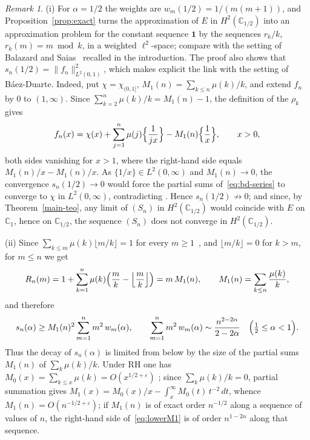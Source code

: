 \documentclass[11pt]{extarticle}
\numberwithin{equation}{section}
\theoremstyle{plain}
\theoremstyle{remark}
\newtheorem{remark}[theorem]{Remark}
\begin{document}
\begin{remark}\label{rem:exact}
(i) For $\alpha = 1/2$ the weights are $w_m(1/2) = 1/(m(m+1))$, and
Proposition~\ref{prop:exact} turns the approximation of $E$ in
$H^2(\mathbb{C}_{1/2})$ into an approximation problem for the constant sequence
$\mathbf{1}$ by the sequences $r_k/k$, $r_k(m) = m \bmod k$, in a weighted
$\ell^2$-space; compare with the setting of Balazard and Saias~\cite{Balazard}
recalled in the introduction. The proof also shows that
$s_n(1/2) = \|f_n\|^2_{L^2(0,1)}$, which makes explicit the link with the
setting of B\'aez-Duarte. Indeed, put $\chi = \chi_{(0,1]}$,
$M_1(n) = \sum_{k \leq n} \mu(k)/k$, and extend $f_n$ by $0$ to $(1,\infty)$.
Since $\sum_{k=2}^{n} \mu(k)/k = M_1(n) - 1$, the definition of the $\rho_k$ gives
\[
f_n(x) = \chi(x) + \sum_{j=1}^{n} \mu(j) \Bigl\{ \frac{1}{jx} \Bigr\}
- M_1(n) \Bigl\{ \frac{1}{x} \Bigr\}, \qquad x > 0,
\]
both sides vanishing for $x > 1$, where the right-hand side equals
$M_1(n)/x - M_1(n)/x$. As $\{1/x\} \in L^2(0,\infty)$ and $M_1(n) \to 0$, the
convergence $s_n(1/2) \to 0$ would force the partial sums of~\eqref{eq:bd-series} to
converge to $\chi$ in $L^2(0,\infty)$, contradicting
\cite[Theorem~2.2]{baez-unitary}. Hence $s_n(1/2) \not\to 0$; and since, by
Theorem~\ref{main-teo}, any limit of $(S_n)$ in $H^2(\mathbb{C}_{1/2})$ would
coincide with $E$ on $\mathbb{C}_1$, hence on $\mathbb{C}_{1/2}$, the sequence
$(S_n)$ does not converge in $H^2(\mathbb{C}_{1/2})$.

(ii) Since $\sum_{k \leq m} \mu(k) \lfloor m/k \rfloor = 1$ for every
$m \geq 1$~\cite[Theorem~3.12]{apostol}, and $\lfloor m/k \rfloor = 0$ for $k > m$, for
$m \leq n$ we get
\[
R_n(m) = 1 + \sum_{k=1}^{n} \mu(k)\Bigl(\frac{m}{k} - \Bigl\lfloor \frac{m}{k} \Bigr\rfloor\Bigr)
= m\, M_1(n), \qquad M_1(n) = \sum_{k \leq n} \frac{\mu(k)}{k},
\]
and therefore
\begin{equation}\label{eq:lowerM1}
s_n(\alpha) \geq M_1(n)^2 \sum_{m=1}^{n} m^2\, w_m(\alpha),
\qquad
\sum_{m=1}^{n} m^2\, w_m(\alpha) \sim \frac{n^{2-2\alpha}}{2-2\alpha}
\quad \Bigl(\tfrac12 \leq \alpha < 1\Bigr).
\end{equation}
Thus the decay of $s_n(\alpha)$ is limited from below by the size of the partial sums
$M_1(n)$ of $\sum_k \mu(k)/k$. Under RH one has $M_0(x)=\sum_{k\le x}\mu(k)=O(x^{1/2+\varepsilon})$
\cite[Theorem~14.25(C)]{titchmarsh}; since $\sum_{k}\mu(k)/k=0$, partial
summation gives $M_1(x)=M_0(x)/x-\int_x^\infty M_0(t)\,t^{-2}\,dt$, whence
$M_1(n)=O(n^{-1/2+\varepsilon})$; if $M_1(n)$ is of exact order $n^{-1/2}$ along a
sequence of values of $n$, the right-hand side of~\eqref{eq:lowerM1} is of order
$n^{1-2\alpha}$ along that sequence.
\end{remark}
\end{document}
